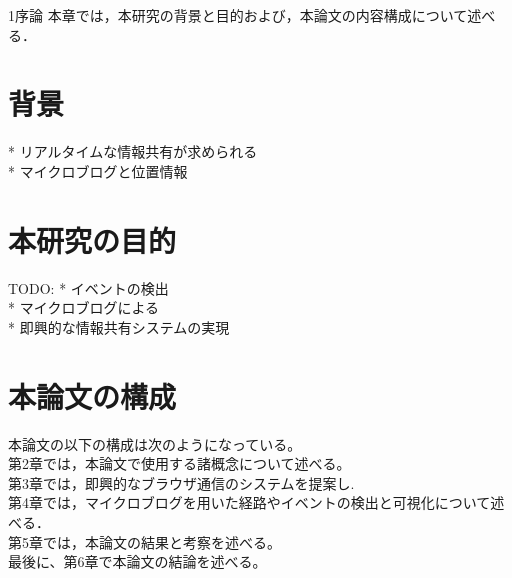 \chapterhead
{1}{序論}
{本章では，本研究の背景と目的および，本論文の内容構成について述べる．}

\section{背景}

* リアルタイムな情報共有が求められる\\
* マイクロブログと位置情報\\


\newpage

\section{本研究の目的}
TODO:
* イベントの検出 \\
* マイクロブログによる \\
* 即興的な情報共有システムの実現

\newpage

\section{本論文の構成}
本論文の以下の構成は次のようになっている。\\
第2章では，本論文で使用する諸概念について述べる。\\
第3章では，即興的なブラウザ通信のシステムを提案し. \\
第4章では，マイクロブログを用いた経路やイベントの検出と可視化について述べる．\\
第5章では，本論文の結果と考察を述べる。\\
最後に、第6章で本論文の結論を述べる。\\
